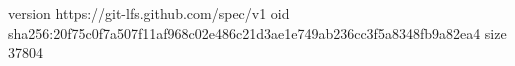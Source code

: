 version https://git-lfs.github.com/spec/v1
oid sha256:20f75c0f7a507f11af968c02e486c21d3ae1e749ab236cc3f5a8348fb9a82ea4
size 37804
